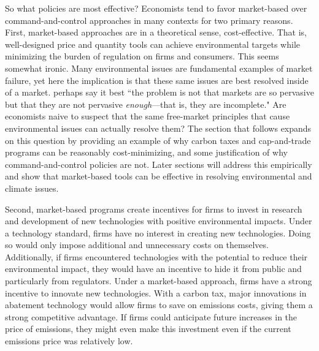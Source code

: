 
So what policies are most effective? Economists tend to favor market-based over command-and-control approaches in many contexts for two primary reasons. First, market-based approaches are in a theoretical sense, cost-effective. That is, well-designed price and quantity tools can achieve environmental targets while minimizing the burden of regulation on firms and consumers. This seems somewhat ironic. Many environmental issues are fundamental examples of market failure, yet here the implication is that these same issues are best resolved inside of a market. \cite{keohane2016markets} perhaps say it best ``the problem is not that markets are so pervasive but that they are not pervasive \emph{enough}---that is, they are incomplete." Are economists naive to suspect that the same free-market principles that cause environmental issues can actually resolve them? The section that follows expands on this question by providing an example of why carbon taxes and cap-and-trade programs can be reasonably cost-minimizing, and some justification of why command-and-control policies are not. Later sections will address this empirically and show that market-based tools can be effective in resolving environmental and climate issues.

Second, market-based programs create incentives for firms to invest in research and development of new technologies with positive environmental impacts. Under a technology standard, firms have no interest in creating new technologies. Doing so would only impose additional and unnecessary costs on themselves. Additionally, if firms encountered technologies with the potential to reduce their environmental impact, they would have an incentive to hide it from public and particularly from regulators. Under a market-based approach, firms have a strong incentive to innovate new technologies. With a carbon tax, major innovations in abatement technology would allow firms to save on emissions costs, giving them a strong competitive advantage. If firms could anticipate future increases in the price of emissions, they might even make this investment even if the current emissions price was relatively low.
 
